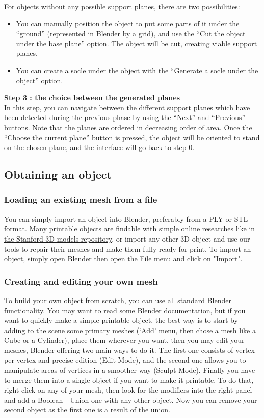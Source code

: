 \documentclass{article}
\begin{document}
For objects without any possible support planes, there are two possibilities:
\begin{itemize}
\item You can manually position the object to put some parts of it under the ``ground'' (represented in Blender by a grid), and use the ``Cut the object under the base plane'' option. The object will be cut, creating viable support planes.
\item You can create a socle under the object with the ``Generate a socle under the object'' option.
\end{itemize}

\textbf{Step 3 : the choice between the generated planes}\\ 

In this step, you can navigate between the different support planes which have been detected during the previous phase by using the ``Next'' and ``Previous'' buttons. Note that the planes are ordered in decreasing order of area. Once the ``Choose the current plane'' button is pressed, the object will be oriented to stand on the chosen plane, and the interface will go back to step 0.

\subsection{Obtaining an object}

\subsubsection{Loading an existing mesh from a file}

You can simply import an object into Blender, preferably from a PLY or STL format. Many printable objects are findable with simple online researches like in \href{http://graphics.stanford.edu/data/3Dscanrep/}{the Stanford 3D models repository}, or import any other 3D object and use our tools to repair their meshes and make them fully ready for print.
To import an object, simply open Blender then open the File menu and click on "Import".

\subsubsection{Creating and editing your own mesh}

To build your own object from scratch, you can use all standard Blender functionality. You may want to read some Blender documentation, but if you want to quickly make a simple printable object, the best way is to start by adding to the scene some primary meshes (`Add' menu, then chose a mesh like a Cube or a Cylinder), place them wherever you want, then you may edit your meshes, Blender offering two main ways to do it. The first one consists of vertex per vertex and precise edition (Edit Mode), and the second one allows you to manipulate areas of vertices in a smoother way (Sculpt Mode). Finally you have to merge them into a single object if you want to make it printable. To do that, right click on any of your mesh, then look for the modifiers into the right panel and add a Boolean - Union one with any other object. Now you can remove your second object as the first one is a result of the union.
\end{document}
